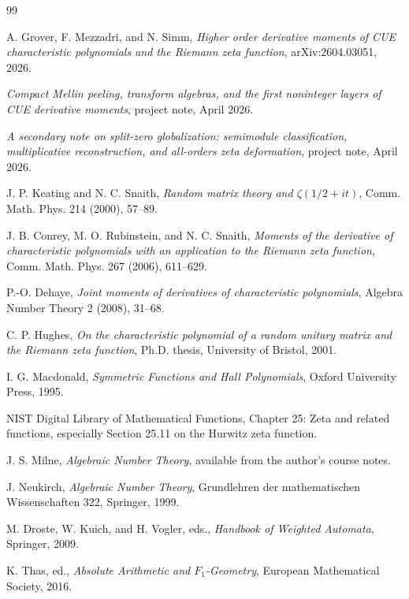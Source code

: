 \documentclass[11pt]{article}
\newcommand{\1}{\mathbf 1}
\numberwithin{equation}{section}
\begin{document}
\begin{thebibliography}{99}

A. Grover, F. Mezzadri, and N. Simm,
\emph{Higher order derivative moments of CUE characteristic polynomials and the Riemann zeta function}, arXiv:2604.03051, 2026.

\emph{Compact Mellin peeling, transform algebras, and the first noninteger layers of CUE derivative moments}, project note, April 2026.

\emph{A secondary note on split-zero globalization: semimodule classification, multiplicative reconstruction, and all-orders zeta deformation}, project note, April 2026.

J. P. Keating and N. C. Snaith,
\emph{Random matrix theory and $\zeta(1/2+it)$}, Comm. Math. Phys. 214 (2000), 57--89.

J. B. Conrey, M. O. Rubinstein, and N. C. Snaith,
\emph{Moments of the derivative of characteristic polynomials with an application to the Riemann zeta function}, Comm. Math. Phys. 267 (2006), 611--629.

P.-O. Dehaye,
\emph{Joint moments of derivatives of characteristic polynomials}, Algebra Number Theory 2 (2008), 31--68.

C. P. Hughes,
\emph{On the characteristic polynomial of a random unitary matrix and the Riemann zeta function}, Ph.D. thesis, University of Bristol, 2001.

I. G. Macdonald,
\emph{Symmetric Functions and Hall Polynomials}, Oxford University Press, 1995.

NIST Digital Library of Mathematical Functions, Chapter 25: Zeta and related functions, especially Section 25.11 on the Hurwitz zeta function.

J. S. Milne,
\emph{Algebraic Number Theory}, available from the author's course notes.

J. Neukirch,
\emph{Algebraic Number Theory}, Grundlehren der mathematischen Wissenschaften 322, Springer, 1999.

M. Droste, W. Kuich, and H. Vogler, eds.,
\emph{Handbook of Weighted Automata}, Springer, 2009.

K. Thas, ed.,
\emph{Absolute Arithmetic and $F_1$-Geometry}, European Mathematical Society, 2016.

\end{thebibliography}
\end{document}
